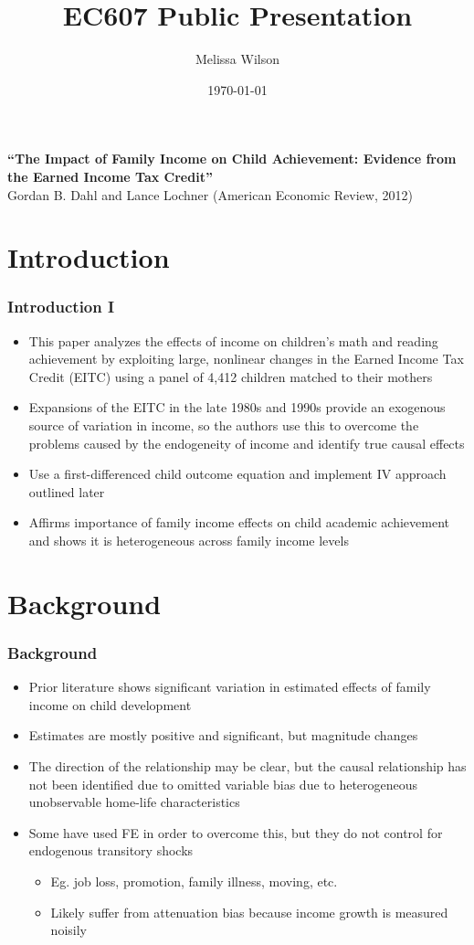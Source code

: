\documentclass{beamer}
\title{EC607 Public Presentation}
\author{Melissa Wilson}
\institute{University of Oregon}
\date{\today}
\begin{document}
\begin{frame}
\titlepage
\end{frame}

\begin{frame}
\frametitle{}
{\bf ``The Impact of Family Income on Child Achievement: Evidence from the Earned Income Tax Credit''} \\
Gordan B. Dahl and Lance Lochner (American Economic Review, 2012)
\end{frame}


\section{Introduction}


\begin{frame}
\frametitle{Introduction I}
\begin{itemize}
	\item This paper analyzes the effects of income on children's math and reading achievement by exploiting large, nonlinear changes in the Earned Income Tax Credit (EITC) using a panel of 4,412 children matched to their mothers
	\item Expansions of the EITC in the late 1980s and 1990s provide an exogenous source of variation in income, so the authors use this to overcome the problems caused by the endogeneity of income and identify true causal effects
	\item Use a first-differenced child outcome equation and implement IV approach outlined later
	\item Affirms importance of family income effects on child academic achievement and shows it is heterogeneous across family income levels
\end{itemize}
\end{frame}


\section{Background}


\begin{frame}
\frametitle{Background}
\begin{itemize}
	\item Prior literature shows significant variation in estimated effects of family income on child development
	\item Estimates are mostly positive and significant, but magnitude changes
	\item The direction of the relationship may be clear, but the causal relationship has not been identified due to omitted variable bias due to heterogeneous unobservable home-life characteristics 
	\item Some have used FE in order to overcome this, but they do not control for endogenous transitory shocks
	\begin{itemize}
		\item Eg. job loss, promotion, family illness, moving, etc.
		\item Likely suffer from attenuation bias because income growth is measured noisily
	\end{itemize} 
\end{itemize}
\end{frame}
\end{document}
